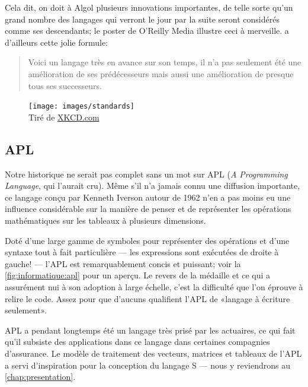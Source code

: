 Cela dit, on doit à Algol plusieurs innovations importantes, de telle
sorte qu'un grand nombre des langages qui verront le jour par la suite
seront considérés comme ses descendants; le poster
 de O'Reilly Media illustre ceci à
merveille. \citet{Hoare:1973} a d'ailleurs cette jolie formule:
\begin{quote}
  Voici un langage très en avance sur son temps, il n'a pas seulement
  été une amélioration de ses prédécesseurs mais aussi une
  amélioration de presque tous ses successeurs.
\end{quote}

\begin{figure}[t]
  \centering
  \begin{minipage}{0.9\linewidth}
    \texttt{[image: images/standards]} \\
    \footnotesize\sffamily%
    Tiré de \href{http://xkcd.com/927/}{XKCD.com}
  \end{minipage}
\end{figure}

\subsection{APL}
\label{sec:informatique:historique:apl}

Notre historique ne serait pas complet sans un mot sur APL
(\emph{A Programming Language}, qui l'aurait cru). Même s'il n'a
jamais connu une diffusion importante, ce langage conçu par Kenneth
Iverson autour de 1962 n'en a pas moins eu une influence considérable
sur la manière de penser et de représenter les opérations
mathématiques sur les tableaux à plusieurs dimensions.

Doté d'une large gamme de symboles pour représenter des opérations et
d'une syntaxe tout à fait particulière --- les expressions sont
exécutées de droite à gauche! --- l'APL est remarquablement concis et
puissant; voir la \autoref{fig:informatique:apl} pour un aperçu. Le
revers de la médaille et ce qui a assurément nui à son adoption
à large échelle, c'est la difficulté que l'on éprouve à relire le
code. Assez pour que d'aucuns qualifient l'APL de «langage à écriture
seulement».

APL a pendant longtemps été un langage très prisé par les actuaires,
ce qui fait qu'il subsiste des applications dans ce langage dans
certaines compagnies d'assurance. Le modèle de traitement des
vecteurs, matrices et tableaux de l'APL a servi d'inspiration pour la
conception du langage S --- nous y reviendrons au
\autoref{chap:presentation}.

